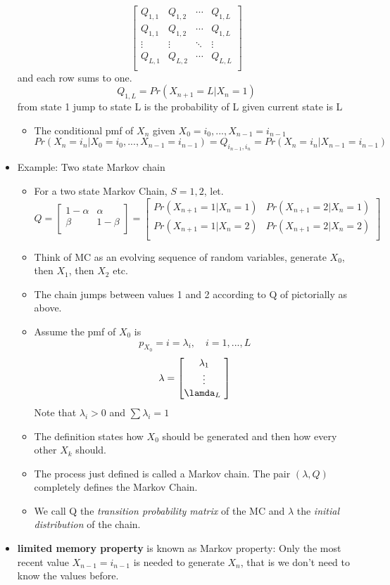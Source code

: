 \documentclass[12pt]{article}
\begin{document}
\begin{itemize}
\[
\begin{bmatrix}
Q_{1,1 } & Q_{1,2} & \cdots & Q_{1,L} \\
Q_{1,1 } & Q_{1,2} & \cdots & Q_{1,L} \\
\vdots & \vdots & \ddots & \vdots \\
Q_{L,1 } & Q_{L,2} & \cdots & Q_{L,L} \\
\end{bmatrix}
\]
and each row sums to one.
\[
Q_{1,L} = Pr(X_{n+1}=L | X_n = 1) 
\]
from state 1 jump to state L is the probability of L given  current state is L
\begin{itemize}
\item The conditional pmf of $X_n$ given $X_0=i_0,...,X_{n-1}=i_{n-1}$
\[Pr(X_n =i_n | X_0=i_0,...,X_{n-1}=i_{n-1}) = Q_{i_{n-1},i_n} = Pr(X_n =i_n | X_{n-1}=i_{n-1})
\]
\end{itemize}
\item Example: Two state Markov chain 
\begin{itemize}
\item For a two state Markov Chain, $S={1,2}$, let.
\[
Q = \begin{bmatrix}
1- \alpha & \alpha \\
\beta     & 1 - \beta \\
\end{bmatrix}
= \begin{bmatrix}
Pr(X_{n+1} =1 | X_n =1) & Pr(X_{n+1} = 2 | X_n =1) \\
Pr(X_{n+1} =1 | X_n =2) & Pr(X_{n+1} = 2 | X_n =2) \\
\end{bmatrix}
\]
\item Think of MC as an evolving sequence of random variables, generate $X_0$, then $X_1$, then $X_2$ etc.
\item The chain jumps between values 1 and 2 according to Q of pictorially as above.
\item Assume the pmf of $ X_0$ is 
\[
p_{X_0} =i = \lambda_i, \quad i=1,...,L
\]
\[
\lambda = \begin{bmatrix}
\lambda_1 \\
\vdots \\
\lamda_L
\
\end{bmatrix}
\]
Note that $\lambda_i > 0$ and $\sum \lambda_i = 1$
\item The definition states how $X_0$ should be generated and then how every other $X_k$ should.
\item The process just defined is called a Markov chain. The pair $(\lambda, Q)$ completely defines the Markov Chain.
\item We call Q the \textit{transition probability matrix} of the MC and $\lambda$ the \textit{initial distribution} of the chain. 
\end{itemize}
\item \textbf{limited memory property } is known as Markov property: Only the most recent value $X_{n-1} = i_{n-1}$ is needed to generate $X_n$, that is we don't need to know the values before.
\end{itemize}
\end{document}
